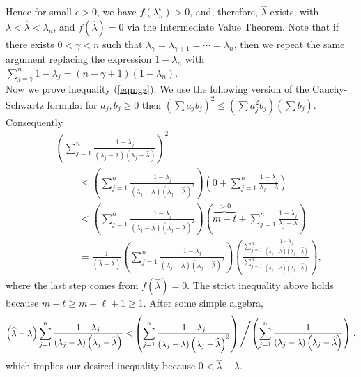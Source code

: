 \documentclass[final,leqno,onefignum,onetabnum]{siamltex1213}
\begin{document}
Hence for small $\epsilon>0$, we have $f\left(\lambda_n^\epsilon\right)>0$, and, therefore, $\widehat{\lambda}$ exists, with $\lambda<\widehat{\lambda}<\lambda_n$, and $f\left(\widehat{\lambda}\right)=0$ via the Intermediate Value Theorem.  Note that if there exists $0<\gamma<n$ such that $\lambda_{\gamma}=\lambda_{\gamma+1}=\cdots=\lambda_n$, then we repeat the same argument replacing the expression $1-\lambda_n$ with $\sum_{j=\gamma}^n1-\lambda_j=(n-\gamma+1)\left(1-\lambda_n\right)$.\\

Now we prove inequality (\ref{eqn:gz}).  We use the following version of the Cauchy-Schwartz formula: for $a_j,b_j\ge0$ then $\left(\sum a_jb_j\right)^2\le\left(\sum a_j^2 b_j\right)\left(\sum b_j\right)$. Consequently
\begin{eqnarray*}
&&{\displaystyle \left(\sum_{j=1}^n\frac{1-\lambda_j}{\left(\lambda_j-\lambda\right)\left(\lambda_j-\widehat{\lambda}\right)}\right)^2 } \\
&&{\displaystyle  \hspace{1cm}\le\left( \sum_{j=1}^n\frac{1-\lambda_j}{\left(\lambda_j-\lambda\right)\left(\lambda_j-\widehat{\lambda}\right)^2}\right)\left( 0 + \sum_{j=1}^n\frac{1-\lambda_j}{\lambda_j-\lambda}\right)} \\
&&{\displaystyle\hspace{1cm} <\left(\sum_{j=1}^n\frac{1-\lambda_j}{\left(\lambda_j-\lambda\right)\left(\lambda_j-\widehat{\lambda}\right)^2}\right)\left(\overbrace{m-t}^{>0}+\sum_{j=1}^n\frac{1-\lambda_j}{\lambda_j-\lambda}\right)} \\
&&{\displaystyle \hspace{1cm}=\frac{1}{\left(\widehat{\lambda}-\lambda\right)} \left( \sum_{j=1}^n\frac{1-\lambda_j}{\left(\lambda_j-\lambda\right)\left(\lambda_j-\widehat{\lambda}\right)^2}\right)\left(\frac{ \sum_{j=1}^n\frac{1-\lambda_j}{\left(\lambda_j-\lambda\right)\left(\lambda_j-\widehat{\lambda}\right)}}{\sum_{j=1}^n\frac{1}{\left(\lambda_j-\lambda\right)\left(\lambda_j-\widehat{\lambda}\right)}}\right),}
\end{eqnarray*}
where the last step comes from 
$f\left(\widehat{\lambda}\right)=0$. The strict inequality above holds
because $m-t \geq m-\ell+1 \geq 1.$ After some simple algebra,
\small
\[{\displaystyle
\left(\widehat{\lambda}-\lambda\right)\sum_{j=1}^n\frac{1-\lambda_j}{\left(\lambda_j-\lambda\right)\left(\lambda_j-\widehat{\lambda}\right)}< \left(\sum_{j=1}^n\frac{1-\lambda_j}{\left(\lambda_j-\lambda\right)\left(\lambda_j-\widehat{\lambda}\right)^2}\right) \left/ \left(\sum_{j=1}^n\frac{1}{\left(\lambda_j-\lambda\right)\left(\lambda_j-\widehat{\lambda}\right)}\right)\right.,}\]
\normalsize
which implies our desired inequality because $0 < \widehat{\lambda}-\lambda$.
\hspace{2 em}\endproof
\end{document}
